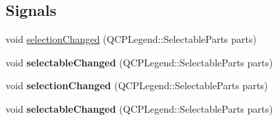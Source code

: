 \subsection*{Signals}
\begin{DoxyCompactItemize}
\item 
void \hyperlink{class_q_c_p_legend_a82c88464edac07a9eefaf3906268df3b}{selection\+Changed} (Q\+C\+P\+Legend\+::\+Selectable\+Parts parts)
\item 
void {\bfseries selectable\+Changed} (Q\+C\+P\+Legend\+::\+Selectable\+Parts parts)\hypertarget{class_q_c_p_legend_a8a77300fd0976d6bdd8000f4e8d114b8}{}\label{class_q_c_p_legend_a8a77300fd0976d6bdd8000f4e8d114b8}

\item 
void {\bfseries selection\+Changed} (Q\+C\+P\+Legend\+::\+Selectable\+Parts parts)\hypertarget{class_q_c_p_legend_a82c88464edac07a9eefaf3906268df3b}{}\label{class_q_c_p_legend_a82c88464edac07a9eefaf3906268df3b}

\item 
void {\bfseries selectable\+Changed} (Q\+C\+P\+Legend\+::\+Selectable\+Parts parts)\hypertarget{class_q_c_p_legend_a8a77300fd0976d6bdd8000f4e8d114b8}{}\label{class_q_c_p_legend_a8a77300fd0976d6bdd8000f4e8d114b8}

\end{DoxyCompactItemize}

